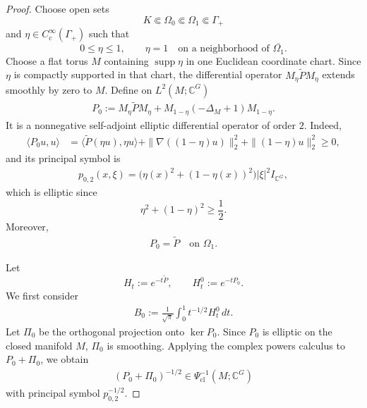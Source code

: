 \documentclass{amsart}
\begin{document}
\begin{proof}
Choose open sets
\[
K\Subset\Omega_0\Subset\Omega_1\Subset\Gamma_+
\]
and \(\eta\in C_c^\infty(\Gamma_+)\) such that
\[
0\leq\eta\leq1,
\qquad
\eta=1
\quad\text{on a neighborhood of }\overline{\Omega_1}.
\]
Choose a flat torus \(M\) containing
\(\operatorname{supp}\eta\) in one Euclidean coordinate chart.
Since \(\eta\) is compactly supported in that chart, the differential
operator \(M_\eta\widetilde P M_\eta\) extends smoothly by zero to
\(M\). Define on \(L^2(M;\mathbb C^G)\)
\begin{align}
P_0
:=
M_\eta\widetilde P M_\eta
+
M_{1-\eta}(-\Delta_M+1)M_{1-\eta}.
\label{eq:Dunkl-local-elliptic-extension}
\end{align}
It is a nonnegative self-adjoint elliptic differential operator of
order \(2\). Indeed,
\begin{align*}
\langle P_0u,u\rangle
&=
\langle
\widetilde P(\eta u),\eta u
\rangle
+
\|\nabla((1-\eta)u)\|_2^2
+
\|(1-\eta)u\|_2^2
\geq0,
\end{align*}
and its principal symbol is
\begin{align*}
p_{0,2}(x,\xi)
=
\bigl(
\eta(x)^2+(1-\eta(x))^2
\bigr)
|\xi|^2I_{\mathbb C^G},
\end{align*}
which is elliptic since
\[
\eta^2+(1-\eta)^2\geq\frac12.
\]
Moreover,
\begin{align}
P_0=\widetilde P
\quad\text{on }\Omega_1.
\label{eq:Dunkl-P-P0-local-equality}
\end{align}

Let
\[
H_t:=e^{-t\widetilde P},
\qquad
H_t^0:=e^{-tP_0}.
\]
We first consider
\begin{align*}
B_0
:=
\frac1{\sqrt\pi}
\int_0^1
t^{-1/2}H_t^0\,dt.
\end{align*}
Let \(\Pi_0\) be the orthogonal projection onto \(\ker P_0\).
Since \(P_0\) is elliptic on the closed manifold \(M\),
\(\Pi_0\) is smoothing. Applying the complex powers calculus
\cite[Theorem~2 and p.~290]{MR0237943} to
\(P_0+\Pi_0\), we obtain
\begin{align*}
(P_0+\Pi_0)^{-1/2}
\in
\Psi_{\mathrm{cl}}^{-1}(M;\mathbb C^G)
\end{align*}
with principal symbol \(p_{0,2}^{-1/2}\).


\end{proof}
\end{document}
